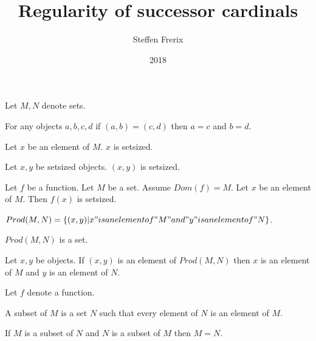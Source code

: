 \documentclass{article}
\title{Regularity of successor cardinals}
\author{Steffen Frerix}
\date{2018}
\begin{document}

  \maketitle

  \begin{forthel}

    Let $M,N$ denote sets.

    \begin{axiom}
      For any objects $a,b,c,d$ if $(a,b) = (c,d)$ then $a = c$ and $b = d$.
    \end{axiom}

    \begin{axiom}
      Let $x$ be an element of $M$. $x$ is setsized.
    \end{axiom}

    \begin{axiom}
      Let $x,y$ be setsized objects. $(x, y)$ is setsized.
    \end{axiom}

    \begin{axiom}
      Let $f$ be a function. Let $M$ be a set. Assume $Dom(f) = M$.
      Let $x$ be an element of $M$. Then $f(x)$ is setsized.
    \end{axiom}

    \begin{definition}
      $Prod(M,N) = \{(x,y) | x "is an element of" M "and" y "is an element of" N\}$.
    \end{definition}

    \begin{axiom}
      $Prod(M, N)$ is a set.
    \end{axiom}

    \begin{lemma}
      Let $x,y$ be objects. If $(x,y)$ is an element of $Prod(M,N)$ then $x$ is an element of $M$ and $y$ is an element of $N$.
    \end{lemma}

    Let $f$ denote a function.

    \begin{definition}
      A subset of $M$ is a set $N$ such that every element of $N$ is an element of $M$.
    \end{definition}

    \begin{axiom}[Extensionality]
      If $M$ is a subset of $N$ and $N$ is a subset of $M$ then $M = N$.
    \end{axiom}


\end{forthel}
\end{document}
